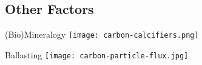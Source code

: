 \subsection{Other Factors}

\begin{frame}{(Bio)Mineralogy}
    \centering
    \texttt{[image: carbon-calcifiers.png]}

\end{frame}

\begin{frame}{Ballasting}
    \centering
    \texttt{[image: carbon-particle-flux.jpg]}

\end{frame}







